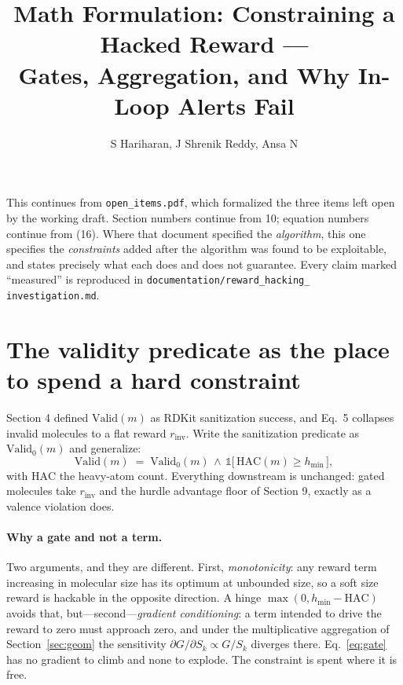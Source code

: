 \documentclass[11pt]{article}
\title{Math Formulation: Constraining a Hacked Reward ---\\
Gates, Aggregation, and Why In-Loop Alerts Fail}
\author{S Hariharan, J Shrenik Reddy, Ansa N}
\date{}
\newcommand{\1}{\mathbb{1}}
\newcommand{\Valid}{\mathrm{Valid}}
\begin{document}
\maketitle

\noindent This continues from \texttt{open\_items.pdf}, which formalized
the three items left open by the working draft. Section numbers continue
from 10; equation numbers continue from (16). Where that document
specified the \emph{algorithm}, this one specifies the \emph{constraints}
added after the algorithm was found to be exploitable, and states
precisely what each does and does not guarantee. Every claim marked
``measured'' is reproduced in \texttt{documentation/reward\_hacking\_%
investigation.md}.

\section{The validity predicate as the place to spend a hard constraint}
\label{sec:gate}

Section 4 defined $\Valid(m)$ as RDKit sanitization success, and Eq.~5
collapses invalid molecules to a flat reward $r_{\mathrm{inv}}$. Write the
sanitization predicate as $\Valid_0(m)$ and generalize:
\begin{equation}
\Valid(m) \;=\; \Valid_0(m) \,\wedge\, \1\!\big[\,\mathrm{HAC}(m) \ge h_{\min}\,\big],
\label{eq:gate}
\end{equation}
with $\mathrm{HAC}$ the heavy-atom count. Everything downstream is
unchanged: gated molecules take $r_{\mathrm{inv}}$ and the hurdle
advantage floor of Section 9, exactly as a valence violation does.

\paragraph{Why a gate and not a term.} Two arguments, and they are
different. First, \emph{monotonicity}: any reward term increasing in
molecular size has its optimum at unbounded size, so a soft size reward is
hackable in the opposite direction. A hinge $\max(0, h_{\min}-\mathrm{HAC})$
avoids that, but---second---\emph{gradient conditioning}: a term intended
to drive the reward to zero must approach zero, and under the
multiplicative aggregation of Section~\ref{sec:geom} the sensitivity
$\partial G/\partial S_k \propto G/S_k$ diverges there. Eq.~\eqref{eq:gate}
has no gradient to climb and none to explode. The constraint is spent
where it is free.
\end{document}
